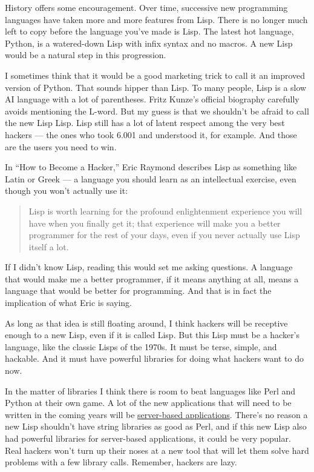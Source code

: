 \documentclass[12pt]{book}
\begin{document}
History offers some encouragement. Over time, successive new programming
languages have taken more and more features from Lisp. There is no
longer much left to copy before the language you've made is Lisp. The
latest hot language, Python, is a watered-down Lisp with infix syntax
and no macros. A new Lisp would be a natural step in this progression.

I sometimes think that it would be a good marketing trick to call it an
improved version of Python. That sounds hipper than Lisp. To many
people, Lisp is a slow AI language with a lot of parentheses. Fritz
Kunze's official biography carefully avoids mentioning the L-word. But
my guess is that we shouldn't be afraid to call the new Lisp Lisp. Lisp
still has a lot of latent respect among the very best hackers --- the
ones who took 6.001 and understood it, for example. And those are the
users you need to win.

In ``How to Become a Hacker,'' Eric Raymond describes Lisp as something
like Latin or Greek --- a language you should learn as an intellectual
exercise, even though you won't actually use it:

\begin{quote}
Lisp is worth learning for the profound enlightenment experience you
will have when you finally get it; that experience will make you a
better programmer for the rest of your days, even if you never actually
use Lisp itself a lot.
\end{quote}

If I didn't know Lisp, reading this would set me asking questions. A
language that would make me a better programmer, if it means anything at
all, means a language that would be better for programming. And that is
in fact the implication of what Eric is saying.

As long as that idea is still floating around, I think hackers will be
receptive enough to a new Lisp, even if it is called Lisp. But this Lisp
must be a hacker's language, like the classic Lisps of the 1970s. It
must be terse, simple, and hackable. And it must have powerful libraries
for doing what hackers want to do now.

In the matter of libraries I think there is room to beat languages like
Perl and Python at their own game. A lot of the new applications that
will need to be written in the coming years will be
\href{road.html}{server-based applications}. There's no reason a new
Lisp shouldn't have string libraries as good as Perl, and if this new
Lisp also had powerful libraries for server-based applications, it could
be very popular. Real hackers won't turn up their noses at a new tool
that will let them solve hard problems with a few library calls.
Remember, hackers are lazy.
\end{document}
